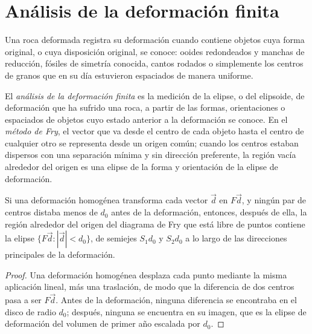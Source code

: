 \section{Análisis de la deformación finita}\label{sec:b3:structural-analysis:strain}

Una roca deformada registra su deformación cuando contiene objetos cuya
forma original, o cuya disposición original, se conoce: ooides redondeados y
manchas de reducción, fósiles de simetría conocida, cantos rodados o
simplemente los centros de granos que en su día estuvieron espaciados de manera uniforme.

\begin{definition}\label{def:b3:structural-analysis:strain-analysis}
El \emph{análisis de la deformación finita} es la medición
de la elipse, o del elipsoide, de deformación que ha sufrido una roca, a partir de las
formas, orientaciones o espaciados de objetos cuyo estado anterior a la
deformación se conoce. En el \emph{método de Fry}, el vector
que va desde el centro de cada objeto hasta el centro de cualquier otro se representa desde
un origen común; cuando los centros estaban dispersos con una separación mínima y sin
dirección preferente, la región vacía alrededor del origen es una elipse de la
forma y orientación de la elipse de deformación.
\end{definition}

\begin{proposition}\label{prop:b3:structural-analysis:fry}
Si una deformación homogénea transforma cada vector $\vec d$ en $F\vec d$, y ningún par de
centros distaba menos de $d_0$ antes de la deformación, entonces, después de ella, la región
alrededor del origen del diagrama de Fry que está libre de puntos contiene la elipse
$\{F\vec d : |\vec d| < d_0\}$, de semiejes $S_1d_0$ y $S_2d_0$ a lo largo de las
direcciones principales de la deformación.
\end{proposition}

\begin{proof}
Una deformación homogénea desplaza cada punto mediante la misma aplicación lineal, más una
traslación, de modo que la diferencia de dos centros pasa a ser $F\vec d$. Antes de la
deformación, ninguna diferencia se encontraba en el disco de radio $d_0$; después, ninguna se encuentra en
su imagen, que es la elipse de deformación del volumen de primer año escalada por $d_0$.
\end{proof}

